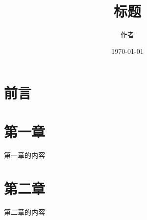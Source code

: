 \documentclass[
	border={25mm 20mm 25mm 30mm},  %
	varwidth,  %
]{standalone}
\title{标题}
\author{作者}
\date{\today}
\begin{document}
	\hspace*{\textwidth}  %
	
	\maketitle
	
	\tableofcontents

	\setlength{\parindent}{2em}  %
	\setcounter{section}{-1}  %
	
	\section{前言}
	
	\section{第一章}
	第一章的内容
	
	\section{第二章}
	第二章的内容
\end{document}
